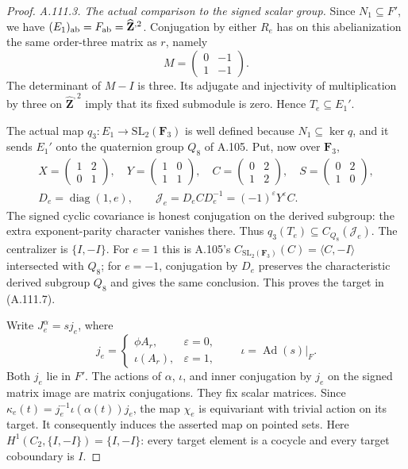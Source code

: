 \begin{proof}
\emph{A.111.3. The actual comparison to the signed scalar group.}
Since \(N_1\subseteq F'\), we have
\((E_1)_{\rm ab}=F_{\rm ab}=\widehat{\mathbf Z}^{,2}\).
Conjugation by either \(R_e\) has on this abelianization the
same order-three matrix as \(r\), namely
\[
                  M=\begin{pmatrix}0&-1\\1&-1\end{pmatrix}.
\]
The determinant of \(M-I\) is three. Its adjugate and
injectivity of multiplication by three on
\(\widehat{\mathbf Z}^{,2}\) imply that its fixed submodule
is zero. Hence \(T_e\subseteq E_1'\).

The actual map \(q_3:E_1\to\mathrm{SL}_2(\mathbf F_3)\)
is well defined because \(N_1\subseteq\ker q\), and it sends
\(E_1'\) onto the quaternion group \(Q_8\) of A.105.
Put, now over \(\mathbf F_3\),
\[
 \begin{gathered}
 X=\begin{pmatrix}1&2\\0&1\end{pmatrix},\quad
 Y=\begin{pmatrix}1&0\\1&1\end{pmatrix},\quad
 C=\begin{pmatrix}0&2\\1&2\end{pmatrix},\quad
 S=\begin{pmatrix}0&2\\1&0\end{pmatrix},\\
 D_e=\operatorname{diag}(1,e),\qquad
 \mathcal J_e=D_eCD_e^{-1}=(-1)^{\varepsilon}Y^{\varepsilon}C.
 \end{gathered}
\tag{A.111.13}
\]
The signed cyclic covariance is honest conjugation on the
derived subgroup: the extra exponent-parity character vanishes
there. Thus \(q_3(T_e)\subseteq C_{Q_8}(\mathcal J_e)\).
The centralizer is \(\{I,-I\}\). For \(e=1\) this is A.105's
\(C_{\mathrm{SL}_2(\mathbf F_3)}(C)=\langle C,-I\rangle\)
intersected with \(Q_8\); for \(e=-1\), conjugation by \(D_e\)
preserves the characteristic derived subgroup \(Q_8\) and gives
the same conclusion. This proves the target in (A.111.7).

Write \(J_e^{\alpha}=sj_e\), where
\[
 j_e=\begin{cases}\phi A_r,&\varepsilon=0,\\
 \iota(A_r),&\varepsilon=1,
 \end{cases}
 \qquad \iota=\operatorname{Ad}(s)|_F.
\tag{A.111.14}
\]
Both \(j_e\) lie in \(F'\). The actions of \(\alpha\),
\(\iota\), and inner conjugation by \(j_e\) on the signed
matrix image are matrix conjugations. They fix scalar matrices.
Since \(\kappa_e(t)=j_e^{-1}\iota(\alpha(t))j_e\), the map
\(\chi_e\) is equivariant with trivial action on its target.
It consequently induces the asserted map on pointed sets.
Here \(H^1(C_2,\{I,-I\})=\{I,-I\}\): every target element
is a cocycle and every target coboundary is \(I\).


\end{proof}
